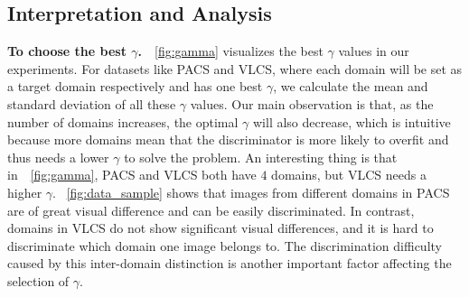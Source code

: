 \documentclass{article} \usepackage{iclr2023_conference,times}
\newcommand{\abbr}[0]{DANN+ELS\xspace}
\begin{document}
\begin{figure*}[htb]
\centering
\vspace{-0.2cm}
\centering
\vspace{-0.2cm}
\caption{(a) Generalization performance of \abbr compared to DANN with partial correct environment label on the PACS dataset ($P$ as target domain). (b) {The best $\gamma$ for each dataset.} Civil is the CivilComments dataset and OGB is the OGB-MolPCBA dataset. (c) Average generalization accuracy on the PACS dataset with different smoothing policies.} 
\vspace{-0.2cm}
\end{figure*}
\vspace{-0.1cm}
\subsection{Interpretation and Analysis}
\vspace{-0.1cm}
\noindent\textbf{To choose the best $\gamma$.}~\figurename~\ref{fig:gamma} visualizes the best $\gamma$ values in our experiments. For datasets like PACS and VLCS, where each domain will be set as a target domain respectively and has one best $\gamma$, we calculate the mean and standard deviation of all these $\gamma$ values. Our main observation is that, as the number of domains increases, the optimal $\gamma$ will also decrease, which is intuitive because more domains mean that the discriminator is more likely to overfit and thus needs a lower $\gamma$ to solve the problem. An interesting thing is that in~\figurename~\ref{fig:gamma}, PACS and VLCS both have $4$ domains, but VLCS needs a higher $\gamma$. \figurename~\ref{fig:data_sample} shows that images from different domains in PACS are of great visual difference and can be easily discriminated. In contrast, domains in VLCS do not show significant visual differences, and it is hard to discriminate which domain one image belongs to. The discrimination difficulty caused by this inter-domain distinction is another important factor affecting the selection of $\gamma$.
\end{document}
